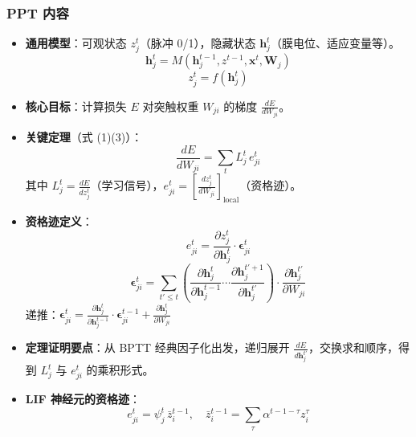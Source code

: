 \documentclass[journal,12pt,onecolumn]{IEEEtran}
\begin{document}
\subsubsection*{PPT 内容}
\begin{itemize}
    \item \textbf{通用模型}：可观状态 $z_j^t$（脉冲 0/1），隐藏状态 $\mathbf{h}_j^t$（膜电位、适应变量等）。
        \begin{equation}
            \mathbf{h}_j^t = M(\mathbf{h}_j^{t-1}, z^{t-1}, \mathbf{x}^t, \mathbf{W}_j)
        \end{equation}
        \begin{equation}
            z_j^t = f(\mathbf{h}_j^t)
        \end{equation}
    \item \textbf{核心目标}：计算损失 $E$ 对突触权重 $W_{ji}$ 的梯度 $\frac{dE}{dW_{ji}}$。
    \item \textbf{关键定理}（式 (1)(3)）：
        \begin{equation}
            \frac{dE}{dW_{ji}} = \sum_t L_j^t \, e_{ji}^t
        \end{equation}
        其中 $L_j^t = \frac{dE}{dz_j^t}$（学习信号），$e_{ji}^t = \left[\frac{dz_j^t}{dW_{ji}}\right]_{\text{local}}$（资格迹）。
    \item \textbf{资格迹定义}：
        \begin{equation}
            e_{ji}^t = \frac{\partial z_j^t}{\partial \mathbf{h}_j^t} \cdot \boldsymbol{\epsilon}_{ji}^t
        \end{equation}
        \begin{equation}
            \boldsymbol{\epsilon}_{ji}^t = \sum_{t'\le t} \left( \frac{\partial \mathbf{h}_j^t}{\partial \mathbf{h}_j^{t-1}} \cdots \frac{\partial \mathbf{h}_j^{t'+1}}{\partial \mathbf{h}_j^{t'}} \right) \cdot \frac{\partial \mathbf{h}_j^{t'}}{\partial W_{ji}}
        \end{equation}
        递推：$\boldsymbol{\epsilon}_{ji}^t = \frac{\partial \mathbf{h}_j^t}{\partial \mathbf{h}_j^{t-1}} \cdot \boldsymbol{\epsilon}_{ji}^{t-1} + \frac{\partial \mathbf{h}_j^t}{\partial W_{ji}}$
    \item \textbf{定理证明要点}：从 BPTT 经典因子化出发，递归展开 $\frac{dE}{d\mathbf{h}_j^{t'}}$，交换求和顺序，得到 $L_j^t$ 与 $e_{ji}^t$ 的乘积形式。
    \item \textbf{LIF 神经元的资格迹}：
        \begin{equation}
            e_{ji}^t = \psi_j^t \, \bar{z}_i^{t-1}, \quad \bar{z}_i^{t-1} = \sum_{\tau} \alpha^{t-1-\tau} z_i^\tau

\end{equation}
\end{itemize}
\end{document}
